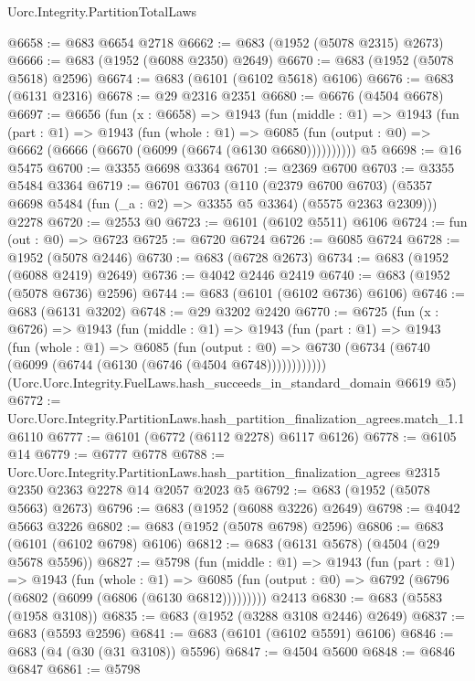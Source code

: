 \begin{lexlean}{Uorc.Integrity.PartitionTotalLaws}
\begin{coremodule}
@6658 := @683 @6654 @2718
@6662 := @683 (@1952 (@5078 @2315) @2673)
@6666 := @683 (@1952 (@6088 @2350) @2649)
@6670 := @683 (@1952 (@5078 @5618) @2596)
@6674 := @683 (@6101 (@6102 @5618) @6106)
@6676 := @683 (@6131 @2316)
@6678 := @29 @2316 @2351
@6680 := @6676 (@4504 @6678)
@6697 := @6656
    (fun (x : @6658) =>
    @1943
      (fun (middle : @1) =>
      @1943
        (fun (part : @1) =>
        @1943
          (fun (whole : @1) =>
          @6085 (fun (output : @0) => @6662 (@6666 (@6670 (@6099 (@6674 (@6130 @6680))))))))))
    @5
@6698 := @16 @5475
@6700 := @3355 @6698 @3364
@6701 := @2369 @6700
@6703 := @3355 @5484 @3364
@6719 := @6701
    @6703
    (@110
      (@2379 @6700 @6703)
      (@5357 @6698 @5484 (fun (_a : @2) => @3355 @5 @3364) (@5575 @2363 @2309)))
    @2278
@6720 := @2553 @0
@6723 := @6101 (@6102 @5511) @6106
@6724 := fun (out : @0) => @6723
@6725 := @6720 @6724
@6726 := @6085 @6724
@6728 := @1952 (@5078 @2446)
@6730 := @683 (@6728 @2673)
@6734 := @683 (@1952 (@6088 @2419) @2649)
@6736 := @4042 @2446 @2419
@6740 := @683 (@1952 (@5078 @6736) @2596)
@6744 := @683 (@6101 (@6102 @6736) @6106)
@6746 := @683 (@6131 @3202)
@6748 := @29 @3202 @2420
@6770 := @6725
    (fun (x : @6726) =>
    @1943
      (fun (middle : @1) =>
      @1943
        (fun (part : @1) =>
        @1943
          (fun (whole : @1) =>
          @6085
            (fun (output : @0) =>
            @6730 (@6734 (@6740 (@6099 (@6744 (@6130 (@6746 (@4504 @6748))))))))))))
    (Uorc.Uorc.Integrity.FuelLaws.hash_succeeds_in_standard_domain @6619 @5)
@6772 := Uorc.Uorc.Integrity.PartitionLaws.hash_partition_finalization_agrees.match_1.{1} @6110
@6777 := @6101 (@6772 (@6112 @2278) @6117 @6126)
@6778 := @6105 @14
@6779 := @6777 @6778
@6788 := Uorc.Uorc.Integrity.PartitionLaws.hash_partition_finalization_agrees
    @2315
    @2350
    @2363
    @2278
    @14
    @2057
    @2023
    @5
@6792 := @683 (@1952 (@5078 @5663) @2673)
@6796 := @683 (@1952 (@6088 @3226) @2649)
@6798 := @4042 @5663 @3226
@6802 := @683 (@1952 (@5078 @6798) @2596)
@6806 := @683 (@6101 (@6102 @6798) @6106)
@6812 := @683 (@6131 @5678) (@4504 (@29 @5678 @5596))
@6827 := @5798
    (fun (middle : @1) =>
    @1943
      (fun (part : @1) =>
      @1943
        (fun (whole : @1) =>
        @6085 (fun (output : @0) => @6792 (@6796 (@6802 (@6099 (@6806 (@6130 @6812)))))))))
    @2413
@6830 := @683 (@5583 (@1958 @3108))
@6835 := @683 (@1952 (@3288 @3108 @2446) @2649)
@6837 := @683 (@5593 @2596)
@6841 := @683 (@6101 (@6102 @5591) @6106)
@6846 := @683 (@4 (@30 (@31 @3108)) @5596)
@6847 := @4504 @5600
@6848 := @6846 @6847
@6861 := @5798

\end{coremodule}
\end{lexlean}
